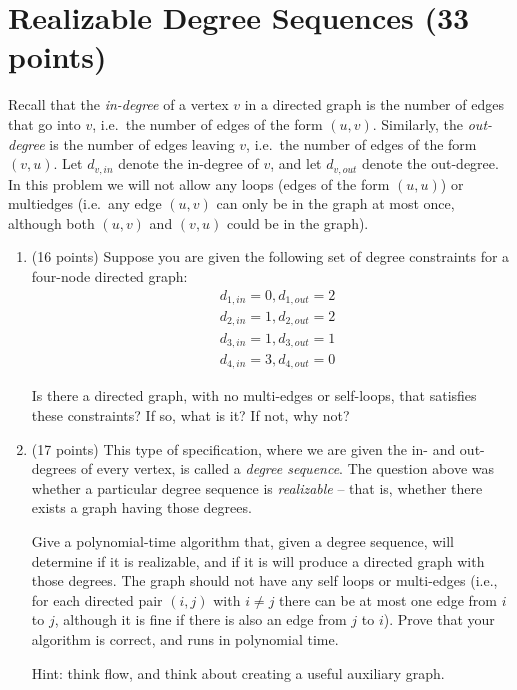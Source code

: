 \documentclass[11pt]{article}
\begin{document}
\section{Realizable Degree Sequences (33 points)}

Recall that the \emph{in-degree} of a vertex $v$ in a directed graph is the number of edges that go into $v$, i.e.~the number of edges of the form $(u,v)$.  Similarly, the \emph{out-degree} is the number of edges leaving $v$, i.e.~the number of edges of the form $(v,u)$.  Let $d_{v,in}$ denote the in-degree of $v$, and let $d_{v,out}$ denote the out-degree.  In this problem we will not allow any loops (edges of the form $(u,u)$) or multiedges (i.e.~any edge $(u,v)$ can only be in the graph at most once, although both $(u,v)$ and $(v,u)$ could be in the graph).

\begin{enumerate}
\item  (16 points)
Suppose you are given the following set of degree constraints for a four-node directed graph:
\begin{align*}
&d_{1,in} = 0, d_{1,out} = 2 \\
&d_{2,in} = 1, d_{2,out} = 2 \\
&d_{3,in} = 1, d_{3,out} = 1 \\
&d_{4,in} = 3, d_{4,out} = 0
\end{align*}

Is there a directed graph, with no multi-edges or self-loops, that satisfies these constraints?  If so, what is it?  If not, why not?



\item (17 points) This type of specification, where we are given the in- and out-degrees of every vertex, is called a \emph{degree sequence}.  The question above was whether a particular degree sequence is \emph{realizable} -- that is, whether there exists a graph having those degrees.  

Give a polynomial-time algorithm that, given a degree sequence, will determine if it is realizable, and if it is will produce a directed graph with those degrees.  The graph should not have any self loops or multi-edges (i.e., for each directed pair $(i,j)$ with $i \neq j$ there can be at most one edge from $i$ to $j$, although it is fine if there is also an edge from $j$ to $i$).  Prove that your algorithm is correct, and runs in polynomial time. 

Hint: think flow, and think about creating a useful auxiliary graph.


\end{enumerate}
\end{document}
